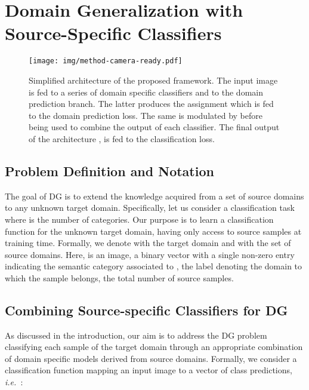 \documentclass{article}
\newcommand{\ie}{\textit{i.e.~}}
\begin{document}
\section{Domain Generalization with Source-Specific Classifiers}

\begin{figure}[t]
\centering
\texttt{[image: img/method-camera-ready.pdf]}
\vspace{-0.3cm}
    \caption{Simplified architecture of the proposed framework. The input image is fed to a series of domain specific classifiers and to the domain prediction branch. The latter produces the assignment  which is fed to the domain prediction loss. The same  is modulated by  before being used to combine the output of each classifier. The final output of the architecture , is fed to the classification loss. \vspace{-0.4cm}    } 
   \label{fig:method}
\end{figure}
\vspace{-0.2cm}
\subsection{Problem Definition and Notation} \vspace{-0.3cm}
The goal of DG is to extend the knowledge acquired from a set of source domains to any unknown target domain. Specifically, let us consider a classification task where  is the number of categories. Our purpose is to learn a classification function  for the unknown target domain, having only access to source samples at training time. Formally, we denote with  the target domain and with   the set of  source domains. Here,  is an image,  a binary vector with a single non-zero entry indicating the semantic category associated to ,  the label denoting the domain to which the sample belongs,  the total number of source samples. 



\vspace{-0.3cm}
\subsection{Combining Source-specific Classifiers for DG}
\vspace{-0.3cm}
As discussed in the introduction, our aim is to address the DG problem classifying each sample of the target domain through an appropriate combination of domain specific models derived from source domains. Formally, we consider a classification function  mapping an input image  to a vector 
of class predictions, \ie: \vspace{-0.3cm}
\end{document}
